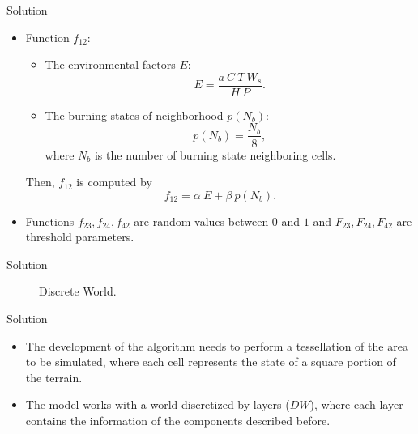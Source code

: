 \documentclass{beamer}
\begin{document}
        \begin{frame}{Solution}
            \begin{itemize}
                \item Function $f_{12}$:
                    \begin{itemize}
                        \item The environmental factors $E$:
                            \begin{equation}
                                E = \frac{a ~ C ~ T ~ W_s}{H ~ P}.
                            \end{equation}
                        \item The burning states of neighborhood $p(N_b)$:
                            \begin{equation}
                                p(N_b) = \frac{N_b}{8},
                            \end{equation}
                            where $N_b$ is the number of burning state neighboring cells.
                    \end{itemize}
                    Then, $f_{12}$ is computed by
                    \begin{equation}
                        f_{12} = \alpha ~ E + \beta ~ p(N_b).
                    \end{equation}
                \item Functions $f_{23}, f_{24}, f_{42}$ are random values between $0$ and $1$ 
                    and $F_{23}, F_{24}, F_{42}$ are threshold parameters.
            \end{itemize}
        \end{frame}
        
        \begin{frame}{Solution}
            \begin{figure}
                \centering
                \resizebox{0.5\textwidth}{!}{
                    
                }    
                \caption{Discrete World.}
                \label{fig:discrete_world}
            \end{figure}
        \end{frame}
            
        \begin{frame}{Solution}
            \begin{itemize}
                \item<1-> The development of the algorithm needs to perform a tessellation of the area 
                    to be simulated, where each cell represents the state of a square portion of the terrain. 
                \item<2-> The model works with a world discretized by layers ($DW$), where each layer contains 
                    the information of the components described before.
            \end{itemize}
        \end{frame}
        
\end{document}
